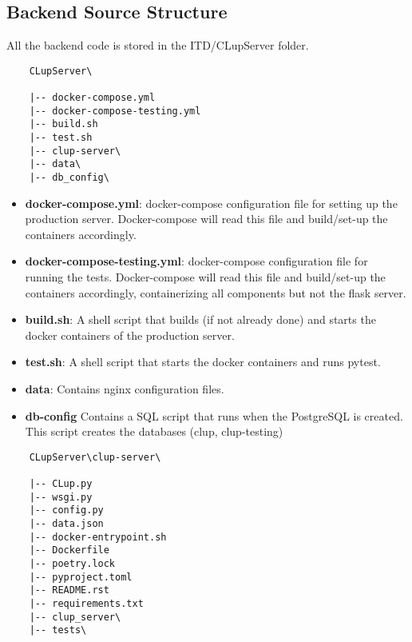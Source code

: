 \subsection{Backend Source Structure}
All the backend code is stored in the ITD/CLupServer folder.
\begin{lstlisting}
    CLupServer\

    |-- docker-compose.yml
    |-- docker-compose-testing.yml
    |-- build.sh
    |-- test.sh
    |-- clup-server\
    |-- data\
    |-- db_config\
\end{lstlisting}

\begin{itemize}
    \item \textbf{docker-compose.yml}: docker-compose configuration file for setting up the production server. Docker-compose will read this file and build/set-up the containers accordingly.
    \item \textbf{docker-compose-testing.yml}: docker-compose configuration file for running the tests. Docker-compose will read this file and build/set-up the containers accordingly, containerizing all components but not the flask server.
    \item \textbf{build.sh}: A shell script that builds (if not already done) and starts the docker containers of the production server.
    \item \textbf{test.sh}: A shell script that starts the docker containers and runs pytest.
    \item \textbf{data}: Contains nginx configuration files.
    \item \textbf{db-config} Contains a SQL script that runs when the PostgreSQL is created. This script creates the databases (clup, clup-testing)
\end{itemize}

\begin{lstlisting}
    CLupServer\clup-server\

    |-- CLup.py
    |-- wsgi.py
    |-- config.py
    |-- data.json
    |-- docker-entrypoint.sh
    |-- Dockerfile
    |-- poetry.lock
    |-- pyproject.toml
    |-- README.rst
    |-- requirements.txt
    |-- clup_server\
    |-- tests\


\end{lstlisting}

